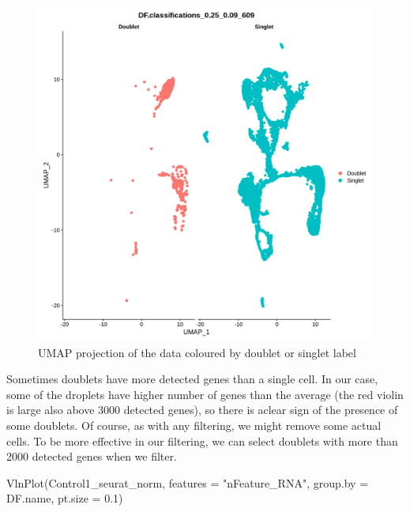 \documentclass[
  letterpaper,
  DIV=11,
  numbers=noendperiod]{scrartcl}
\newenvironment{Shaded}{\begin{snugshade}}{\end{snugshade}}
\newcommand{\AttributeTok}[1]{\textcolor[rgb]{0.49,0.56,0.16}{#1}}
\newcommand{\FloatTok}[1]{\textcolor[rgb]{0.25,0.63,0.44}{#1}}
\newcommand{\FunctionTok}[1]{\textcolor[rgb]{0.02,0.16,0.49}{#1}}
\newcommand{\NormalTok}[1]{\textcolor[rgb]{0.00,0.44,0.13}{#1}}
\newcommand{\StringTok}[1]{\textcolor[rgb]{0.25,0.44,0.63}{#1}}
\begin{document}
\begin{figure}[H]

{\centering \includegraphics{notebook_files/figure-pdf/fig-doublets-output-1.png}

}

\caption{\label{fig-doublets}UMAP projection of the data coloured by
doublet or singlet label}

\end{figure}

Sometimes doublets have more detected genes than a single cell. In our
case, some of the droplets have higher number of genes than the average
(the red violin is large also above 3000 detected genes), so there is
aclear sign of the presence of some doublets. Of course, as with any
filtering, we might remove some actual cells. To be more effective in
our filtering, we can select doublets with more than 2000 detected genes
when we filter.

\begin{Shaded}
\begin{Highlighting}[]
\FunctionTok{VlnPlot}\NormalTok{(Control1\_seurat\_norm, }\AttributeTok{features =} \StringTok{"nFeature\_RNA"}\NormalTok{, }\AttributeTok{group.by =}\NormalTok{ DF.name, }\AttributeTok{pt.size =} \FloatTok{0.1}\NormalTok{)}
\end{Highlighting}
\end{Shaded}
\end{document}
